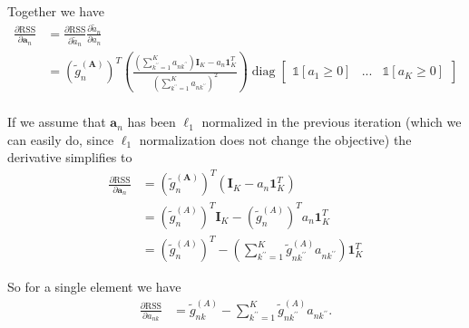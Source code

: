 \documentclass{article}
\begin{document}
Together we have
\begin{equation}
    \begin{aligned}
        \frac{\partial \text{RSS}}{\partial \mathbf{a}_{n}} &= \frac{\partial \text{RSS}}{\partial \tilde{a}_n} \frac{\partial  \tilde{a}_n}{\partial a_n} \\
        &= \left( \tilde{g}^{(\mathbf{A})}_n \right)^T \left( \frac{\left( \sum_{k^{\prime \prime}=1}^K a_{nk^{\prime \prime}} \right) \mathbf{I}_K - a_n \mathbf{1}_K^T}{\left( \sum_{k^{\prime \prime}=1}^K a_{nk^{\prime \prime}} \right)^2} \right)
        \operatorname{diag} \begin{bmatrix} \mathds{1} \left[ a_1 \geq 0 \right] & ... & \mathds{1} \left[ a_K \geq 0 \right] \end{bmatrix}
        \\
    \end{aligned}
\end{equation}

If we assume that $\mathbf{a}_{n}$ has been $\ell_1$ normalized in the previous iteration (which we can easily do, since $\ell_1$ normalization does not change the objective) the derivative simplifies to
\begin{equation}
    \begin{aligned}
        \frac{\partial \text{RSS}}{\partial \mathbf{a}_{n}}
        &= \left( \tilde{g}^{(\mathbf{A})}_n \right)^T \left( \mathbf{I}_K - a_n \mathbf{1}_K^T \right) \\
        &= \left( \tilde{g}^{(A)}_n \right)^T \mathbf{I}_K - \left( \tilde{g}^{(A)}_n \right)^T a_n \mathbf{1}_K^T \\
        &= \left( \tilde{g}^{(A)}_n \right)^T - \left( \sum_{k^{\prime \prime}=1}^K  \tilde{g}^{(A)}_{n k^{\prime \prime}} a_{nk^{\prime \prime}} \right) \mathbf{1}_K^T
    \end{aligned}
\end{equation}

So for a single element we have
\begin{equation}
    \begin{aligned}
        \frac{\partial \text{RSS}}{\partial a_{nk}}
        &= \tilde{g}^{(A)}_{nk} - \sum_{k^{\prime \prime}=1}^K  \tilde{g}^{(A)}_{n k^{\prime \prime}} a_{nk^{\prime \prime}}.
    \end{aligned}
\end{equation}
\end{document}
